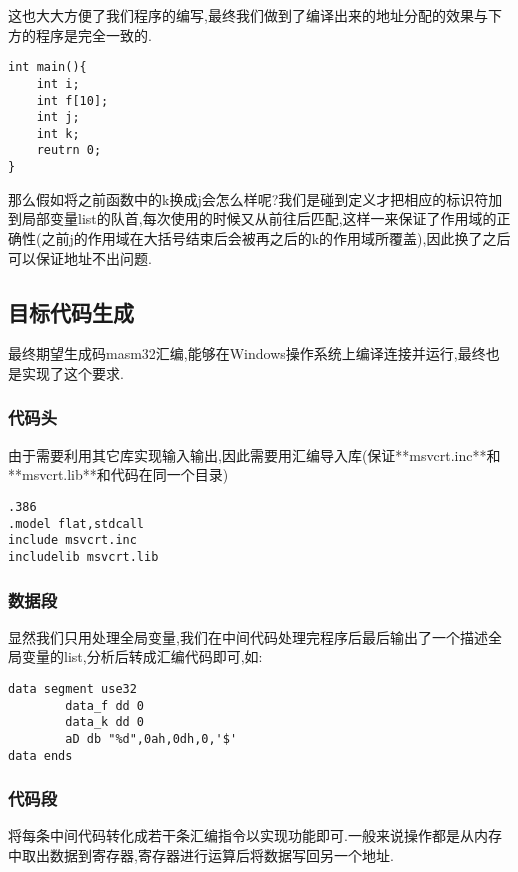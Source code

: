 \documentclass{article}
\begin{document}
这也大大方便了我们程序的编写,最终我们做到了编译出来的地址分配的效果与下方的程序是完全一致的.

\begin{verbatim}
int main(){
    int i;
    int f[10];
    int j;
    int k;
    reutrn 0;
}
\end{verbatim}

那么假如将之前函数中的k换成j会怎么样呢?我们是碰到定义才把相应的标识符加到局部变量list的队首,每次使用的时候又从前往后匹配,这样一来保证了作用域的正确性(之前j的作用域在大括号结束后会被再之后的k的作用域所覆盖),因此换了之后可以保证地址不出问题.

\subsection{目标代码生成}

最终期望生成码masm32汇编,能够在Windows操作系统上编译连接并运行,最终也是实现了这个要求.

\subsubsection{代码头}

由于需要利用其它库实现输入输出,因此需要用汇编导入库(保证**msvcrt.inc**和**msvcrt.lib**和代码在同一个目录)

\begin{verbatim}
.386
.model flat,stdcall
include msvcrt.inc
includelib msvcrt.lib
\end{verbatim}

\subsubsection{数据段}

显然我们只用处理全局变量,我们在中间代码处理完程序后最后输出了一个描述全局变量的list,分析后转成汇编代码即可,如:

\begin{verbatim}
data segment use32
        data_f dd 0
        data_k dd 0
        aD db "%d",0ah,0dh,0,'$'
data ends        
\end{verbatim}

\subsubsection{代码段}

将每条中间代码转化成若干条汇编指令以实现功能即可.一般来说操作都是从内存中取出数据到寄存器,寄存器进行运算后将数据写回另一个地址.
\end{document}
